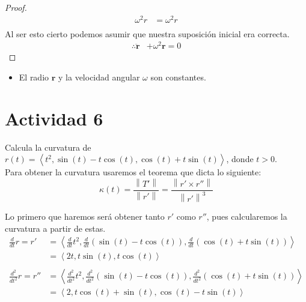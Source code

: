 \documentclass{article}
\newcommand{\norm}[1]{\left\lVert#1\right\rVert}
\newcommand{\custvec}[1]{\left\langle#1\right\rangle}
\begin{document}
\begin{enumerate}
\begin{proof}
\begin{equation*}
\begin{split}
            \omega^2r&=\omega^2r\\
        \end{split}
    \end{equation*}
    Al ser esto cierto podemos asumir que nuestra suposición inicial era correcta.
    \begin{equation*}
        \begin{split}
            \therefore \pmb{\ddot{r}}&+\omega^2 \pmb{r}=0
        \end{split}
    \end{equation*}
    \end{proof}
    \begin{itemize}
        \item El radio $\pmb{r}$ y la velocidad angular $\omega$ son constantes.
    \end{itemize}
\end{enumerate}
\newpage
\section{Actividad 6}
Calcula la curvatura de $r(t)=\custvec{t^2,\sin (t) - t\cos (t), \cos (t) + t\sin (t)}$, donde $t > 0$.\\

Para obtener la curvatura usaremos el teorema que dicta lo siguiente:\\
\begin{equation*}
    \kappa(t) = \frac{\norm{T'}}{\norm{r'}}=\frac{\norm{r' \times r''}}{\norm{r'}^3}
\end{equation*}

Lo primero que haremos será obtener tanto $r'$ como $r''$, pues calcularemos la curvatura a partir de estas.\\
\begin{equation*}
    \begin{split}
        \frac{d}{dt}r=r'&=\custvec{\frac{d}{dt}t^2,\frac{d}{dt}(\sin (t) - t\cos (t)),\frac{d}{dt}(\cos (t) + t\sin (t))}\\
        &=\custvec{2t, t\sin (t), t\cos (t)}\\ \\
        \frac{d^2}{dt^2}r=r''&=\custvec{\frac{d^2}{dt^2}t^2,\frac{d^2}{dt^2}(\sin (t) - t\cos (t)),\frac{d^2}{dt^2}(\cos (t) + t\sin (t))}\\
        &=\custvec{2, t\cos (t) + \sin (t), \cos (t) - t\sin (t)}
    \end{split}
\end{equation*}
\end{document}
